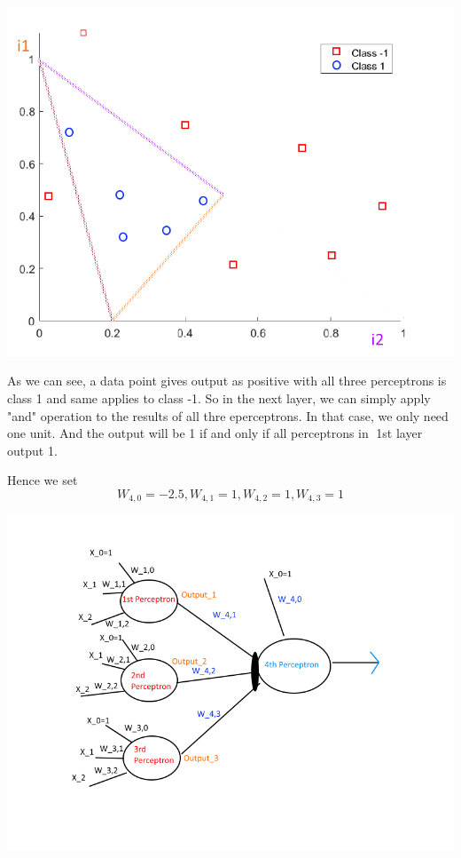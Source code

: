 \documentclass[12pt, letterpaper]{article}
\begin{document}
\includegraphics[scale=0.6]{"problem-5b-1"}

As we can see, a data point gives output as positive with all three perceptrons is class 1 and same applies to class -1.
So in the next layer, we can simply apply "and" operation to the results of all thre eperceptrons. In that case, we only need one unit. And the output will be 1 if and only if all perceptrons in 1st layer output 1.

Hence we set $$W_{4,0}=-2.5,W_{4,1}=1,W_{4,2}=1,W_{4,3}=1$$\newline

\includegraphics[scale=0.6]{"problem-5b-2"}
\end{document}
